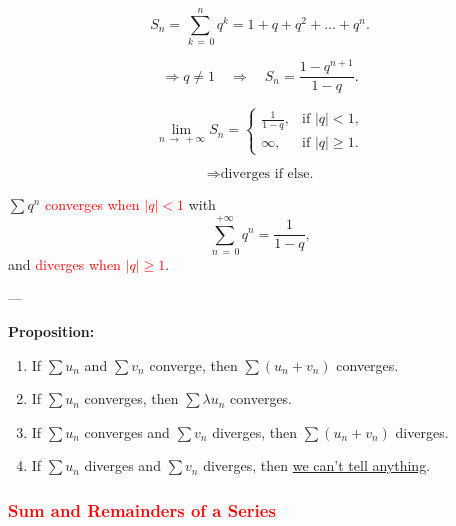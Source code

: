 \documentclass[a4paper,12pt]{article}
\begin{document}
\vspace{0.5cm}

\bigskip

\[
S_n = \sum_{\,k\,=\,0}^n q^k = 1 + q + q^2 + \dots + q^n.
\]

\[
\Rightarrow q \neq 1 \quad \Rightarrow \quad 
S_n = \frac{1 - q^{n+1}}{1-q}.
\]

\[
\lim_{\,n\, \to\, +\infty} S_n =
\begin{cases}
\frac{1}{1-q}, & \text{if } |q| < 1, \\[6pt]
\infty, & \text{if } |q| \geq 1.
\end{cases}
\]

\[
\Rightarrow \text{diverges if else.}
\]

\begin{tcolorbox}[colback=red!5!white,colframe=red!100!black,title=\textcolor{black}{Conclusion}]
$\sum q^n$ \textcolor{red}{converges when $|q| < 1$} with
\[
\sum_{\,n\,=\,0}^{+\infty} q^n = \frac{1}{1-q},
\]
and \textcolor{red}{diverges when $|q| \geq 1$}.
\end{tcolorbox}

---

\textbf{Proposition:} \bigskip


\bigskip

\begin{enumerate}
  \item If $\sum u_n$ and $\sum v_n$ converge, then $\sum (u_n + v_n)$ converges.
  \item If $\sum u_n$ converges, then $\sum \lambda u_n$ converges.
  \item If $\sum u_n$ converges and $\sum v_n$ diverges, then $\sum (u_n+v_n)$ diverges.
  \item If $\sum u_n$ diverges and $\sum v_n$ diverges, then \underline{we can’t tell anything}.
\end{enumerate}

\newpage
\textcolor{red}{\subsubsection*{Sum and Remainders of a Series}} \bigskip

 \bigskip
\end{document}
